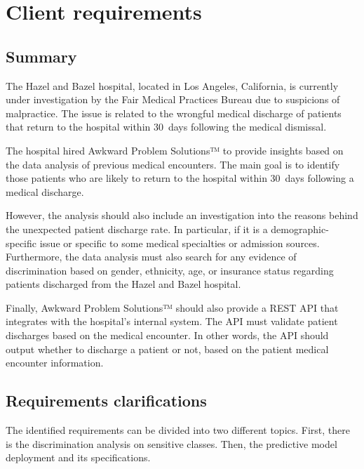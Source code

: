 \documentclass[a4paper,11pt]{article}
\begin{document}


\tableofcontents
\newpage


\newpage
\section{Client requirements}
\subsection{Summary}
The Hazel and Bazel hospital, located in Los Angeles, California, is currently under investigation by the Fair Medical Practices Bureau due to suspicions of malpractice. The issue is related to the wrongful medical discharge of patients that return to the hospital within \SI{30}{days} following the medical dismissal.

The hospital hired Awkward Problem Solutions™ to provide insights based on the data analysis of previous medical encounters. The main goal is to identify those patients who are likely to return to the hospital within \SI{30}{days} following a medical discharge.

However, the analysis should also include an investigation into the reasons behind the unexpected patient discharge rate. In particular, if it is a demographic-specific issue or specific to some medical specialties or admission sources. Furthermore, the data analysis must also search for any evidence of discrimination based on gender, ethnicity, age, or insurance status regarding patients discharged from the Hazel and Bazel hospital.

Finally, Awkward Problem Solutions™ should also provide a REST API that integrates with the hospital’s internal system. The API must validate patient discharges based on the medical encounter. In other words, the API should output whether to discharge a patient or not, based on the patient medical encounter information.



\subsection{Requirements clarifications}
\label{sec:requirements_clarifications}


The identified requirements can be divided into two different topics. First, there is the discrimination analysis on sensitive classes. Then, the predictive model deployment and its specifications.
\end{document}
